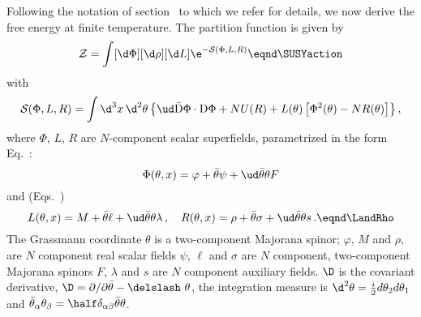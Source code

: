 Following the notation of section \ssNSUSYsc~to which we refer for
details, we now derive the free energy at finite temperature. The
partition function is given by \sslbl\ssNSUSYfreeE
$$ {\cal Z}=\int[\d\Phi][\d\rho][\d L] \e^{-{\cal S}(\Phi,L,R)}
\eqnd\SUSYaction$$
with
$${\cal S}(\Phi,L,R)=\int\d^3 x\,\d^2\theta\left\{\ud\bar {\rm D}\Phi\cdot
{\rm D}\Phi+NU(R)+L(\theta)\left[\Phi^2(\theta)-NR(\theta)\right]
\right\},$$ where $\Phi $, $L$, $R$ are $N$-component scalar
superfields, parametrized in the form Eq.~\PhiSupField:
$$ \Phi(\theta,x) =
\varphi + \bar \theta \psi + \ud  \bar \theta\theta  F   $$ and
(Eqs.~\eqns{\eLsupField,\eRsupField})
$$L(\theta,x)=M+\bar\theta\ell+\ud\bar\theta\theta \lambda\,,
\quad R(\theta,x)=\rho +
\bar\theta\sigma+\ud\bar\theta\theta s\,.\eqnd\LandRho$$
The Grassmann coordinate  $\theta$ is a two-component
Majorana spinor; $\varphi$, $M $ and $\rho$, are $N$ component
real scalar fields $\psi$, $\ell $ and $\sigma$ are $N$ component,
two-component Majorana spinors $F$, $ \lambda $ and $s$ are $N$
component  auxiliary fields. $\D$ is the covariant derivative,
$\D=\partial /
\partial \bar \theta -\delslash ~\theta $, the integration
measure is $\d^2\theta={i\over 2}d\theta_2 d\theta_1$ and
$\bar\theta_\alpha\theta_\beta =
\half\delta_{\alpha\beta}\bar\theta\theta $.

